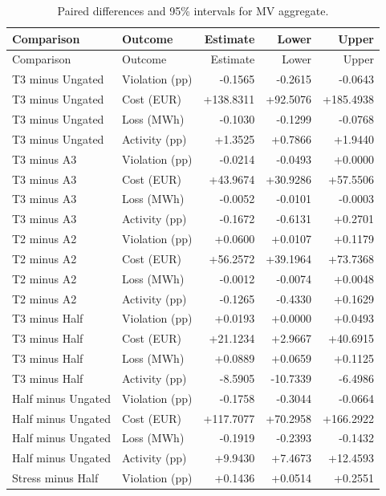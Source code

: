 \documentclass[11pt]{article}
\begin{document}
\small\begin{longtable}{llrrr}
\caption{Paired differences and 95\% intervals for MV aggregate.}\\\toprule
Comparison & Outcome & Estimate & Lower & Upper\\\midrule
\endfirsthead
\toprule
Comparison & Outcome & Estimate & Lower & Upper\\\midrule
\endhead
\bottomrule\endfoot
T3 minus Ungated & Violation (pp) & -0.1565 & -0.2615 & -0.0643\\
T3 minus Ungated & Cost (EUR) & +138.8311 & +92.5076 & +185.4938\\
T3 minus Ungated & Loss (MWh) & -0.1030 & -0.1299 & -0.0768\\
T3 minus Ungated & Activity (pp) & +1.3525 & +0.7866 & +1.9440\\
T3 minus A3 & Violation (pp) & -0.0214 & -0.0493 & +0.0000\\
T3 minus A3 & Cost (EUR) & +43.9674 & +30.9286 & +57.5506\\
T3 minus A3 & Loss (MWh) & -0.0052 & -0.0101 & -0.0003\\
T3 minus A3 & Activity (pp) & -0.1672 & -0.6131 & +0.2701\\
T2 minus A2 & Violation (pp) & +0.0600 & +0.0107 & +0.1179\\
T2 minus A2 & Cost (EUR) & +56.2572 & +39.1964 & +73.7368\\
T2 minus A2 & Loss (MWh) & -0.0012 & -0.0074 & +0.0048\\
T2 minus A2 & Activity (pp) & -0.1265 & -0.4330 & +0.1629\\
T3 minus Half & Violation (pp) & +0.0193 & +0.0000 & +0.0493\\
T3 minus Half & Cost (EUR) & +21.1234 & +2.9667 & +40.6915\\
T3 minus Half & Loss (MWh) & +0.0889 & +0.0659 & +0.1125\\
T3 minus Half & Activity (pp) & -8.5905 & -10.7339 & -6.4986\\
Half minus Ungated & Violation (pp) & -0.1758 & -0.3044 & -0.0664\\
Half minus Ungated & Cost (EUR) & +117.7077 & +70.2958 & +166.2922\\
Half minus Ungated & Loss (MWh) & -0.1919 & -0.2393 & -0.1432\\
Half minus Ungated & Activity (pp) & +9.9430 & +7.4673 & +12.4593\\
Stress minus Half & Violation (pp) & +0.1436 & +0.0514 & +0.2551\\

\end{longtable}
\end{document}
